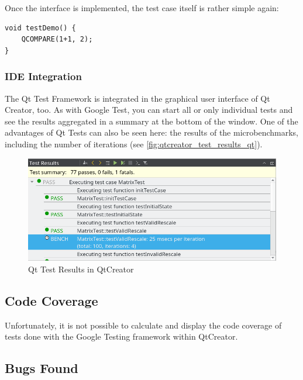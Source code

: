 \documentclass{scrreprt}
\begin{document}
Once the interface is implemented, the test case itself is rather simple again:

\begin{lstlisting}[title=tests-qt/Demo.cpp]
void testDemo() {
	QCOMPARE(1+1, 2);
}
\end{lstlisting}

\subsubsection{IDE Integration}

The Qt Test Framework is integrated in the graphical user interface of Qt Creator, too. As with Google Test, you can start all or only individual tests and see the results aggregated in a summary at the bottom of the window. One of the advantages of Qt Tests can also be seen here: the results of the microbenchmarks, including the number of iterations (see \vref{fig:qtcreator_test_results_qt}).

\begin{figure}[h]
	\centering
	\includegraphics[width=1.0\textwidth]{img/qtcreator_test_results_qt}
	\caption[QtCreator Qt Test Results]{Qt Test Results in QtCreator}
	\label{fig:qtcreator_test_results_qt}
\end{figure}

\subsection{Code Coverage}

Unfortunately, it is not possible to calculate and display the code coverage of tests done with the Google Testing framework within QtCreator.


\subsection{Bugs Found}
\end{document}
